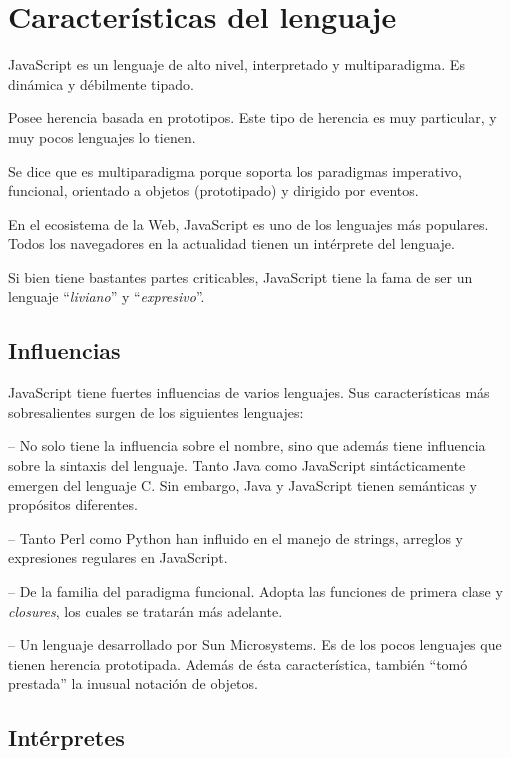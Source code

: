 \section{Características del lenguaje}

JavaScript es un lenguaje de alto nivel, interpretado y multiparadigma. Es dinámica y débilmente tipado. 

Posee herencia basada en prototipos. Este tipo de herencia es muy particular, y muy pocos lenguajes lo tienen. 

Se dice que es multiparadigma porque soporta los paradigmas imperativo, funcional, orientado a objetos (prototipado) y dirigido por eventos.

En el ecosistema de la Web, JavaScript es uno de los lenguajes más populares. Todos los navegadores en la actualidad tienen un intérprete del lenguaje.

Si bien tiene bastantes partes criticables, JavaScript tiene la fama de ser un lenguaje "`\textit{liviano}"' y "`\textit{expresivo}"'.

\subsection{Influencias}

JavaScript tiene fuertes influencias de varios lenguajes. Sus características más sobresalientes surgen de los siguientes lenguajes: 

 -- No solo tiene la influencia sobre el nombre, sino que además tiene influencia sobre la sintaxis del lenguaje. Tanto Java como JavaScript sintácticamente emergen del lenguaje C. Sin embargo, Java y JavaScript tienen semánticas y propósitos diferentes.

 -- Tanto Perl como Python han influido en el manejo de strings, arreglos y expresiones regulares en JavaScript.

 -- De la familia del paradigma funcional. Adopta las funciones de primera clase y \textit{closures}, los cuales se tratarán más adelante.

 -- Un lenguaje desarrollado por Sun Microsystems. Es de los pocos lenguajes que tienen herencia prototipada. Además de ésta característica, también "`tomó prestada"' la inusual notación de objetos.

\subsection{Intérpretes}

